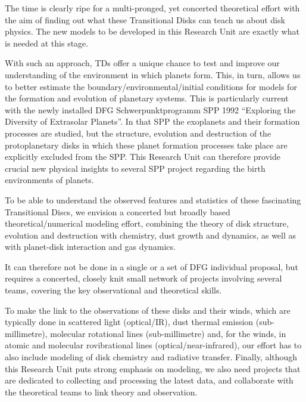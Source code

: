 \documentclass[10pt,fleqn,twoside]{article}
\begin{document}
The time is clearly ripe for a multi-pronged, yet concerted theoretical
effort with the aim of finding out what these Transitional Disks can teach
us about disk physics. The new models to be developed in this Research Unit are exactly
what is needed at this stage.

With such an approach, TDs offer a unique chance to test and improve our
understanding of the environment in which planets form.  This, in turn,
allows us to better estimate the boundary/environmental/initial conditions
for models for the formation and evolution of planetary systems. This is
particularly current with the newly installed DFG Schwerpunktprogramm SPP
1992 ``Exploring the Diversity of Extrasolar Planets''. In that SPP the
exoplanets and their formation processes are studied, but the structure,
evolution and destruction of the protoplanetary disks in which these planet
formation processes take place are explicitly excluded from the SPP. This
Research Unit can therefore provide crucial new physical insights to several
SPP project regarding the birth environments of planets.

%  
  
To be able to understand the observed features and statistics of these
fascinating Transitional Discs, we envision a concerted but broadly based
theoretical/numerical modeling effort, combining the theory of disk
structure, evolution and destruction with chemistry, dust growth and
dynamics, as well as with planet-disk interaction and gas dynamics.

\begin{highlight}
  It can therefore not be done in a single or a set of DFG individual
  proposal, but requires a concerted, closely knit small network of projects
  involving several teams, covering the key observational and theoretical
  skills.
\end{highlight}

To make the link to the observations of these disks and their winds, which
are typically done in scattered light (optical/IR), dust thermal emission
(sub-millimetre), molecular rotational lines (sub-millimetre) and, for the
winds, in atomic and molecular rovibrational lines (optical/near-infrared),
our effort has to also include modeling of disk chemistry and radiative
transfer. Finally, although this Research Unit puts strong emphasis on
modeling, we also need projects that are dedicated to collecting and
processing the latest data, and collaborate with the theoretical teams to
link theory and observation.
%
\end{document}
